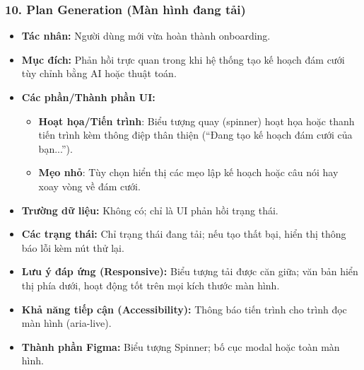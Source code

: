 \documentclass[11pt,a4paper]{article}
\begin{document}
\subsubsection{10. Plan Generation (Màn hình đang tải)}
\begin{itemize}
    \item \textbf{Tác nhân:} Người dùng mới vừa hoàn thành onboarding.
    \item \textbf{Mục đích:} Phản hồi trực quan trong khi hệ thống tạo kế hoạch đám cưới tùy chỉnh bằng AI hoặc thuật toán.
    \item \textbf{Các phần/Thành phần UI:}
    \begin{itemize}
        \item \textbf{Hoạt họa/Tiến trình}: Biểu tượng quay (spinner) hoạt họa hoặc thanh tiến trình kèm thông điệp thân thiện (``Đang tạo kế hoạch đám cưới của bạn...'').
        \item \textbf{Mẹo nhỏ}: Tùy chọn hiển thị các mẹo lập kế hoạch hoặc câu nói hay xoay vòng về đám cưới.
    \end{itemize}
    \item \textbf{Trường dữ liệu:} Không có; chỉ là UI phản hồi trạng thái.
    \item \textbf{Các trạng thái:} Chỉ trạng thái đang tải; nếu tạo thất bại, hiển thị thông báo lỗi kèm nút thử lại.
    \item \textbf{Lưu ý đáp ứng (Responsive):} Biểu tượng tải được căn giữa; văn bản hiển thị phía dưới, hoạt động tốt trên mọi kích thước màn hình.
    \item \textbf{Khả năng tiếp cận (Accessibility):} Thông báo tiến trình cho trình đọc màn hình (aria-live).
    \item \textbf{Thành phần Figma:} Biểu tượng Spinner; bố cục modal hoặc toàn màn hình.
\end{itemize}
\end{document}
